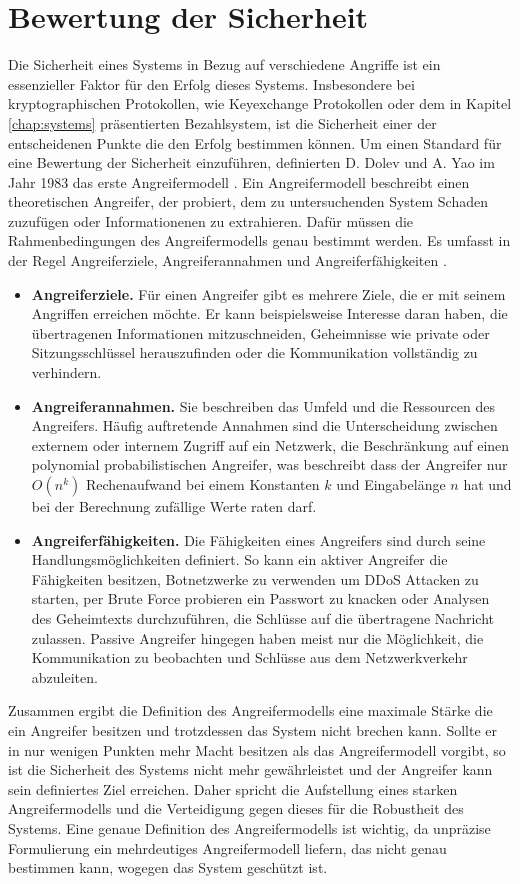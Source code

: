 \documentclass{scrreprt}
\begin{document}
\section{Bewertung der Sicherheit}
Die Sicherheit eines Systems in Bezug auf verschiedene Angriffe ist ein essenzieller Faktor für den Erfolg dieses Systems. Insbesondere bei kryptographischen Protokollen, wie Keyexchange Protokollen oder dem in Kapitel \ref{chap:systems} präsentierten Bezahlsystem, ist die Sicherheit einer der entscheidenen Punkte die den Erfolg bestimmen können. Um einen Standard für eine Bewertung der Sicherheit einzuführen, definierten D. Dolev und A. Yao im Jahr 1983 das erste Angreifermodell \cite{am-dolev1983security}. Ein Angreifermodell beschreibt einen theoretischen Angreifer, der probiert, dem zu untersuchenden System Schaden zuzufügen oder Informationenen zu extrahieren. Dafür müssen die Rahmenbedingungen des Angreifermodells genau bestimmt werden. Es umfasst in der Regel Angreiferziele, Angreiferannahmen und Angreiferfähigkeiten \cite{am-do2019role}. 
\begin{itemize}
    \item \textbf{Angreiferziele.} Für einen Angreifer gibt es mehrere Ziele, die er mit seinem Angriffen erreichen möchte. Er kann beispielsweise Interesse daran haben, die übertragenen Informationen mitzuschneiden, Geheimnisse wie private oder Sitzungsschlüssel herauszufinden oder die Kommunikation vollständig zu verhindern. 
    \item \textbf{Angreiferannahmen.} Sie beschreiben das Umfeld und die Ressourcen des Angreifers. Häufig auftretende Annahmen sind die Unterscheidung zwischen externem oder internem Zugriff auf ein Netzwerk, die Beschränkung auf einen polynomial probabilistischen Angreifer, was beschreibt dass der Angreifer nur $O(n^k)$ Rechenaufwand bei einem Konstanten $k$ und Eingabelänge $n$ hat und bei der Berechnung zufällige Werte raten darf.
    \item \textbf{Angreiferfähigkeiten.} Die Fähigkeiten eines Angreifers sind durch seine Handlungsmöglichkeiten definiert. So kann ein aktiver Angreifer die Fähigkeiten besitzen, Botnetzwerke zu verwenden um DDoS Attacken zu starten, per Brute Force probieren ein Passwort zu knacken oder Analysen des Geheimtexts durchzuführen, die Schlüsse auf die übertragene Nachricht zulassen. Passive Angreifer hingegen haben meist nur die Möglichkeit, die Kommunikation zu beobachten und Schlüsse aus dem Netzwerkverkehr abzuleiten.
\end{itemize} 
Zusammen ergibt die Definition des Angreifermodells eine maximale Stärke die ein Angreifer besitzen und trotzdessen das System nicht brechen kann. Sollte er in nur wenigen Punkten mehr Macht besitzen als das Angreifermodell vorgibt, so ist die Sicherheit des Systems nicht mehr gewährleistet und der Angreifer kann sein definiertes Ziel erreichen. Daher spricht die Aufstellung eines starken Angreifermodells und die Verteidigung gegen dieses für die Robustheit des Systems. Eine genaue Definition des Angreifermodells ist wichtig, da unpräzise Formulierung ein mehrdeutiges Angreifermodell liefern, das nicht genau bestimmen kann, wogegen das System geschützt ist.
\end{document}

